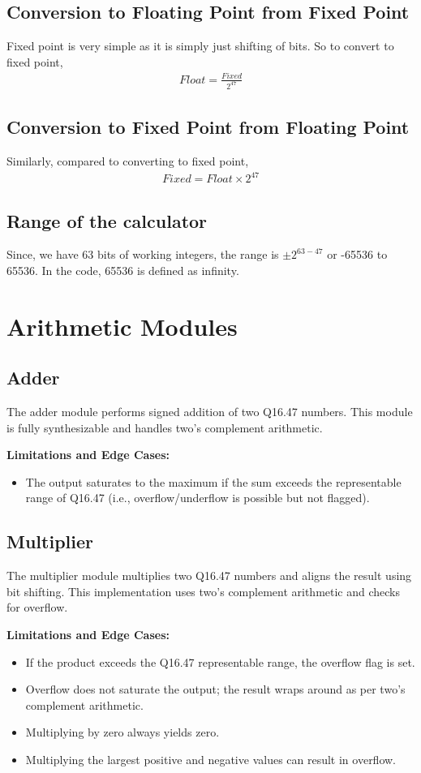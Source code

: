 \documentclass[conference]{IEEEtran}
\begin{document}
\begin{FlushLeft}
\subsection{Conversion to Floating Point from Fixed Point}
Fixed point is very simple as it is simply just shifting of bits. So to convert to fixed point,
\begin{align}
    Float = \frac{Fixed}{2^{47}}
\end{align}
\subsection{Conversion to Fixed Point from Floating Point}
Similarly, compared to converting to fixed point,
\begin{align}
    Fixed = {Float}\times{2^{47}}
\end{align}
\subsection{Range of the calculator}
Since, we have 63 bits of working integers, the range is $\pm 2^{63-47}$ or -65536 to 65536. In the code, 65536 is defined as infinity.
\section{Arithmetic Modules}

\subsection{Adder}
The adder module performs signed addition of two Q16.47 numbers.
This module is fully synthesizable and handles two's complement arithmetic.

\textbf{Limitations and Edge Cases:}
\begin{itemize}
    \item The output saturates to the maximum if the sum exceeds the representable range of Q16.47 (i.e., overflow/underflow is possible but not flagged).
\end{itemize}

\subsection{Multiplier}
The multiplier module multiplies two Q16.47 numbers and aligns the result using bit shifting.
This implementation uses two's complement arithmetic and checks for overflow.

\textbf{Limitations and Edge Cases:}
\begin{itemize}
    \item If the product exceeds the Q16.47 representable range, the overflow flag is set.
    \item Overflow does not saturate the output; the result wraps around as per two's complement arithmetic.
    \item Multiplying by zero always yields zero.
    \item Multiplying the largest positive and negative values can result in overflow.
\end{itemize}


\end{FlushLeft}
\end{document}
